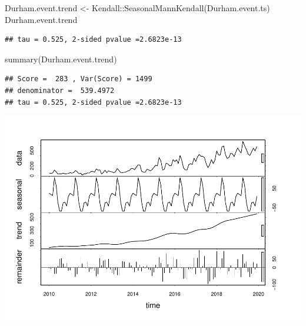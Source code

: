 \documentclass[
  12pt,
]{article}
\newenvironment{Shaded}{\begin{snugshade}}{\end{snugshade}}
\newcommand{\AttributeTok}[1]{\textcolor[rgb]{0.77,0.63,0.00}{#1}}
\newcommand{\CommentTok}[1]{\textcolor[rgb]{0.56,0.35,0.01}{\textit{#1}}}
\newcommand{\DecValTok}[1]{\textcolor[rgb]{0.00,0.00,0.81}{#1}}
\newcommand{\FunctionTok}[1]{\textcolor[rgb]{0.00,0.00,0.00}{#1}}
\newcommand{\NormalTok}[1]{#1}
\newcommand{\OtherTok}[1]{\textcolor[rgb]{0.56,0.35,0.01}{#1}}
\newcommand{\SpecialCharTok}[1]{\textcolor[rgb]{0.00,0.00,0.00}{#1}}
\newcommand{\StringTok}[1]{\textcolor[rgb]{0.31,0.60,0.02}{#1}}
\begin{document}
\begin{Shaded}
\begin{Highlighting}[]
\NormalTok{Durham.event.trend }\OtherTok{\textless{}{-}}\NormalTok{ Kendall}\SpecialCharTok{::}\FunctionTok{SeasonalMannKendall}\NormalTok{(Durham.event.ts) }
\NormalTok{Durham.event.trend}
\end{Highlighting}
\end{Shaded}

\begin{verbatim}
## tau = 0.525, 2-sided pvalue =2.6823e-13
\end{verbatim}

\begin{Shaded}
\begin{Highlighting}[]
\FunctionTok{summary}\NormalTok{(Durham.event.trend)}
\end{Highlighting}
\end{Shaded}

\begin{verbatim}
## Score =  283 , Var(Score) = 1499
## denominator =  539.4972
## tau = 0.525, 2-sided pvalue =2.6823e-13
\end{verbatim}

\begin{Shaded}
\end{Shaded}

\includegraphics{Project_Template_files/figure-latex/Event TS Code-3.pdf}
\end{document}
